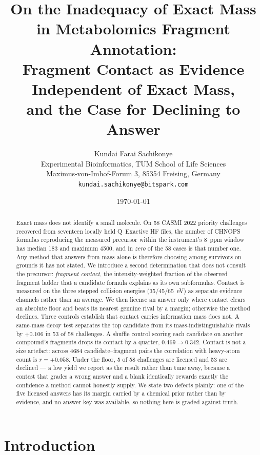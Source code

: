 \documentclass[11pt,twocolumn,a4paper]{article}
\title{On the Inadequacy of Exact Mass in Metabolomics Fragment Annotation:\\
Fragment Contact as Evidence Independent of Exact Mass,\\
and the Case for Declining to Answer}
\author{%
Kundai Farai Sachikonye\\[0.3em]
\normalsize Experimental Bioinformatics, TUM School of Life Sciences\\
\normalsize Maximus-von-Imhof-Forum 3, 85354 Freising, Germany\\
\normalsize \texttt{kundai.sachikonye@bitspark.com}}
\date{\today}
\theoremstyle{definition}
\theoremstyle{remark}
\begin{document}
\maketitle

\begin{abstract}
Exact mass does not identify a small molecule. On 58 CASMI 2022 priority
challenges recovered from seventeen locally held Q~Exactive HF files, the number
of CHNOPS formulas reproducing the measured precursor within the instrument's
8~ppm window has median 183 and maximum 4500, and in \emph{zero} of the 58 cases
is that number one. Any method that answers from mass alone is therefore choosing
among survivors on grounds it has not stated. We introduce a second determination
that does not consult the precursor: \emph{fragment contact}, the
intensity-weighted fraction of the observed fragment ladder that a candidate
formula explains as its own subformulas. Contact is measured on the three stepped
collision energies (35/45/65~eV) as separate evidence channels rather than an
average. We then license an answer only where contact clears an absolute floor
and beats its nearest genuine rival by a margin; otherwise the method declines.
Three controls establish that contact carries information mass does not. A
same-mass decoy test separates the top candidate from its mass-indistinguishable
rivals by $+0.106$ in 53 of 58 challenges. A shuffle control scoring each
candidate on another compound's fragments drops its contact by a quarter,
$0.469 \to 0.342$.
Contact is not a size artefact: across 4684 candidate--fragment pairs the
correlation with heavy-atom count is $r = +0.058$. Under the floor, 5 of 58
challenges are licensed and 53 are declined --- a low yield we report as the
result rather than tune away, because a contest that grades a wrong answer and a
blank identically rewards exactly the confidence a method cannot honestly supply.
We state two defects plainly: one of the five licensed answers has its margin
carried by a chemical prior rather than by evidence, and no answer key was
available, so nothing here is graded against truth.
\end{abstract}

\tableofcontents

\section{Introduction}
\end{document}
